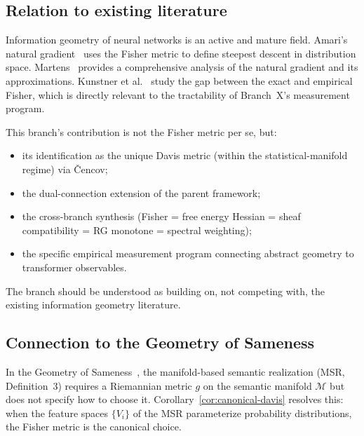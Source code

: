 \documentclass[11pt]{article}
\theoremstyle{remark}
\begin{document}
\subsection{Relation to existing literature}

Information geometry of neural networks is an active and mature field.
Amari's natural gradient~\cite{amari1998} uses the Fisher metric to define
steepest descent in distribution space.
Martens~\cite{martens2020} provides a comprehensive analysis of the natural
gradient and its approximations.
Kunstner et al.~\cite{kunstner2019} study the gap between the exact and
empirical Fisher, which is directly relevant to the tractability of
Branch~X's measurement program.

This branch's contribution is not the Fisher metric per se, but:
\begin{itemize}
  \item its identification as the unique Davis metric (within the
  statistical-manifold regime) via \v{C}encov;
  \item the dual-connection extension of the parent framework;
  \item the cross-branch synthesis (Fisher = free energy Hessian =
  sheaf compatibility = RG monotone = spectral weighting);
  \item the specific empirical measurement program connecting abstract
  geometry to transformer observables.
\end{itemize}
The branch should be understood as building on, not competing with, the
existing information geometry literature.

\subsection{Connection to the Geometry of Sameness}

In the Geometry of Sameness~\cite{davis2025sameness}, the manifold-based
semantic realization (MSR, Definition~3) requires a Riemannian metric $g$
on the semantic manifold $\mathcal{M}$ but does not specify how to choose it.
Corollary~\ref{cor:canonical-davis} resolves this: when the feature spaces
$\{V_i\}$ of the MSR parameterize probability distributions, the Fisher
metric is the canonical choice.
\end{document}
